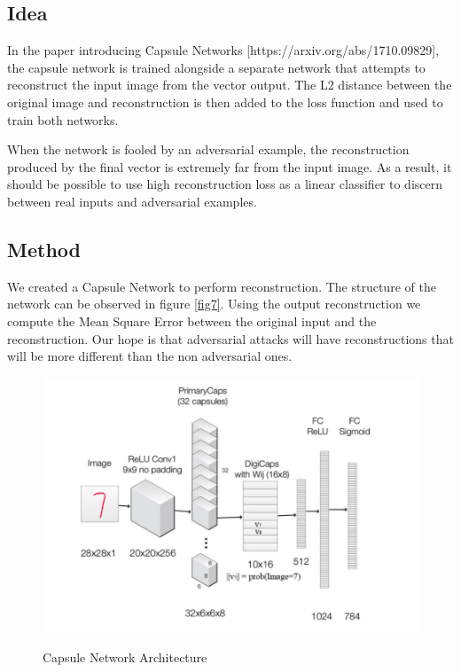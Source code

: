 \documentclass{asaproc}
\begin{document}
\subsection*{Idea}

In the paper introducing Capsule Networks [https://arxiv.org/abs/1710.09829], the capsule network is trained alongside a separate network that attempts to reconstruct the input image from the vector output. The L2 distance between the original image and reconstruction is then added to the loss function and used to train both networks.

When the network is fooled by an adversarial example, the reconstruction produced by the final vector is extremely far from the input image. As a result, it should be possible to use high reconstruction loss as a linear classifier to discern between real inputs and adversarial examples.

\subsection*{Method}

We created a Capsule Network to perform reconstruction. The structure of the network can be observed in figure \ref{fig7}. Using the output reconstruction we compute the Mean Square Error between the original input and the reconstruction. Our hope is that adversarial attacks will have reconstructions that will be more different than the non adversarial ones.

\begin{figure}[h!]
	\centering
	\caption{\enspace Capsule Network Architecture}
	\includegraphics[width=\linewidth]{caps_recon}
	\label{fig3}
\end{figure}
\end{document}

